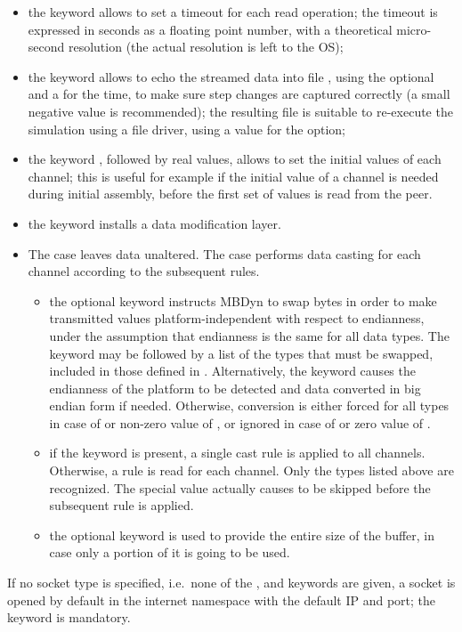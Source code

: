 \begin{itemize}
\item the keyword  allows to set a timeout
for each read operation; the timeout is expressed in seconds
as a floating point number, with a theoretical micro-second resolution
(the actual resolution is left to the OS);

\item the keyword  allows to echo the streamed data
into file , using the optional 
and a  for the time, to make sure step changes are captured
correctly (a small negative value is recommended);
the resulting file is suitable to re-execute the simulation
using a  file driver, using a  value
for the  option;

\item the keyword ,
followed by  real values,
allows to set the initial values of each channel;
this is useful for example if the initial value of a channel
is needed during initial assembly, before the first set of values
is read from the peer.

\item the keyword  installs a data modification layer.

\item The  case leaves data unaltered.
The  case performs data casting for each channel according to the subsequent rules.

\begin{itemize}
\item the optional keyword  instructs MBDyn to swap bytes
in order to make transmitted values platform-independent with respect to endianness,
under the assumption that endianness is the same for all data types.
The keyword  may be followed by a list of the types that must be swapped,
included in those defined in .
Alternatively, the keyword  causes the endianness of the platform
to be detected and data converted in big endian form if needed.
Otherwise, conversion is either forced for all types in case of  or non-zero value of ,
or ignored in case of  or zero value of .

\item if the keyword  is present, a single  cast rule
is applied to all channels.
Otherwise, a  rule is read for each channel.
Only the types listed above are recognized.
The special value  actually causes  to be skipped
before the subsequent  rule is applied.

\item the optional keyword  is used to provide the entire size of the buffer,
in case only a portion of it is going to be used.
\end{itemize}

\end{itemize}
If no socket type is specified, i.e.\ none of the ,  
and  keywords are given, a socket is opened by default 
in the internet namespace with the default IP and port; the 
keyword is mandatory.

